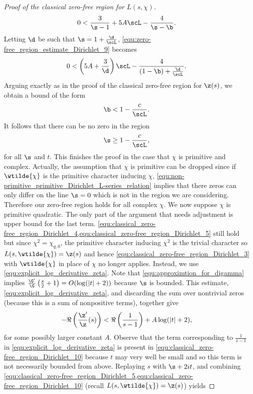 \begin{proof}[Proof of the classical zero-free region for $L(s,\chi)$]
\begin{equation}
          0 < \frac{3}{\s-1}+5A\scL-\frac{4}{\s-\b}.
        \end{equation}
        Letting $\d$ be such that $\s = 1+\frac{\d}{\scL}$, \cref{equ:zero-free_region_estimate_Dirichlet_9} becomes
        \[
          0 < \left(5A+\frac{3}{\d}\right)\scL-\frac{4}{(1-\b)+\frac{\d}{\scL}}.
        \]
        Arguing exactly as in the proof of the classical zero-free region for $\z(s)$, we obtain a bound of the form
        \begin{equation}\label{equ:zero-free_region_estimate_Dirichlet_beta_bound}
          \b < 1-\frac{c}{\scL}.
        \end{equation}
        It follows that there can be no zero in the region
        \begin{equation}\label{equ:zero-free_region_estimate_Dirichlet_sigma_bound}
          \s \ge 1-\frac{c}{\scL},
        \end{equation}
        for all $\s$ and $t$. This finishes the proof in the case that $\chi$ is primitive and complex. Actually, the assumption that $\chi$ is primitive can be dropped since if $\wtilde{\chi}$ is the primitive character inducing $\chi$, \cref{equ:non-primitive_primitive_Dirichlet_L-series_relation} implies that there zeros can only differ on the line $\s = 0$ which is not in the region we are considering. Therefore our zero-free region holds for all complex $\chi$. We now suppose $\chi$ is primitive quadratic. The only part of the argument that needs adjustment is upper bound for the last term. \cref{equ:classical_zero-free_region_Dirichlet_4,equ:classical_zero-free_region_Dirichlet_5} still hold but since $\chi^{2} = \chi_{q,0}$, the primitive character inducing $\chi^{2}$ is the trivial character so $L(s,\wtilde{\chi}) = \z(s)$ and hence \cref{equ:classical_zero-free_region_Dirichlet_3} with $\wtilde{\chi}$ in place of $\chi$ no longer applies. Instead, we use \cref{equ:explicit_log_derivative_zeta}. Note that \cref{equ:approximtion_for_digamma} implies $\frac{\G'}{\G}\left(\frac{s}{2}+1\right) = O(\log(|t|+2))$ because $\s$ is bounded. This estimate, \cref{equ:explicit_log_derivative_zeta}, and discarding the sum over nontrivial zeros (because this is a sum of nonpositive terms), together give
        \begin{equation}\label{equ:classical_zero-free_region_Dirichlet_10}
          -\Re\left(\frac{\z'}{\z}(s)\right) < \Re\left(\frac{1}{s-1}\right)+A\log(|t|+2),
        \end{equation}
        for some possibly larger constant $A$. Observe that the term corresponding to $\frac{1}{s-1}$ in \cref{equ:explicit_log_derivative_zeta} is present in \cref{equ:classical_zero-free_region_Dirichlet_10} because $t$ may very well be small and so this term is not necessarily bounded from above. Replaying $s$ with $\s+2it$, and combining \cref{equ:classical_zero-free_region_Dirichlet_5,equ:classical_zero-free_region_Dirichlet_10} (recall $L(s,\wtilde{\chi}) = \z(s)$) yields

\end{proof}
